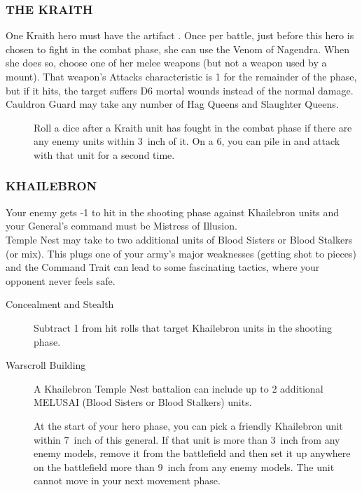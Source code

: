 \subsubsection{THE KRAITH} 
One Kraith hero must have the artifact
\textbf{}.  
Once per battle, just before this hero is chosen to fight in the combat phase,
she can use the Venom of Nagendra. When she does so, choose one of her melee
weapons (but not a weapon used by a mount). That weapon's Attacks
characteristic is 1 for the remainder of the phase, but if it hits, the target
suffers D6 mortal wounds instead of the normal damage.\\ 
Cauldron Guard may take any number of Hag Queens and Slaughter Queens. 
\begin{description}
    \item [] Roll a dice after a Kraith
    unit has fought in the combat phase if there are any enemy units
    within 3~inch of it. On a 6, you can pile in and attack with that unit
    for a second time.
\end{description}

\subsubsection{KHAILEBRON}\label{temple:khailebron}
Your enemy gets -1 to hit in the shooting phase against Khailebron units and
your General's command must be Mistress of Illusion.\\
Temple Nest may take to two additional units of Blood Sisters or Blood Stalkers
(or mix). This plugs one of your army's major weaknesses (getting shot to
pieces) and the Command Trait can
lead to some fascinating tactics, where your opponent never feels safe.
\begin{description}
  \item [Concealment and Stealth] Subtract 1 from hit rolls 
    that target Khailebron units in the shooting phase.
  \item [Warscroll Building] 
    A Khailebron Temple Nest battalion can include up to
    2 additional MELUSAI (Blood Sisters or Blood Stalkers) units.
\item []
     At the start of your hero phase, you can pick
        a friendly Khailebron unit within 7~inch of this general. If that unit
        is more than 3~inch from any enemy models, remove it from the
        battlefield and then set it up anywhere on the battlefield more than
        9~inch from any enemy models. The unit cannot move in your next movement
        phase. 
\end{description}

